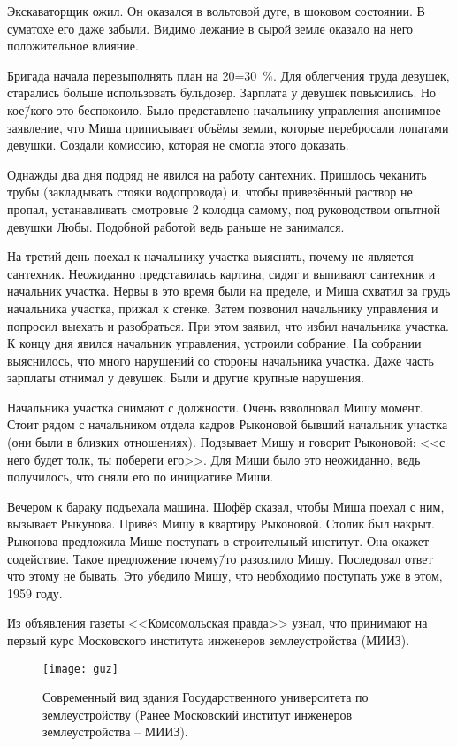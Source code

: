 Экскаваторщик ожил. Он оказался в вольтовой дуге, в шоковом состоянии. В суматохе его даже забыли. Видимо лежание в сырой земле оказало на него положительное влияние. 

Бригада начала перевыполнять план на 20\==30 \%. Для облегчения труда девушек, старались больше использовать бульдозер. Зарплата у девушек повысились. Но кое\=/кого это беспокоило. Было представлено начальнику управления анонимное заявление, что Миша приписывает объёмы земли, которые перебросали лопатами девушки. Создали комиссию, которая не смогла этого доказать.

Однажды два дня подряд не явился на работу сантехник. Пришлось чеканить трубы (закладывать стояки водопровода) и, чтобы привезённый раствор не пропал, устанавливать смотровые 2 колодца самому, под руководством опытной девушки Любы. Подобной работой ведь раньше не занимался.

На третий день поехал к начальнику участка выяснять, почему не является сантехник. Неожиданно представилась картина, сидят и выпивают сантехник и начальник участка. Нервы в это время были на пределе, и Миша схватил за грудь начальника участка, прижал к стенке. Затем позвонил начальнику управления и попросил выехать и разобраться. При этом заявил, что избил начальника участка. К концу дня явился начальник управления, устроили собрание. На собрании выяснилось, что много нарушений со стороны начальника участка. Даже часть зарплаты отнимал у девушек. Были и другие крупные нарушения.

Начальника участка снимают с должности. Очень взволновал Мишу момент. Стоит рядом с начальником отдела кадров Рыконовой бывший начальник участка (они были в близких отношениях). Подзывает Мишу и говорит Рыконовой: <<с него будет толк, ты побереги его>>. Для Миши было это неожиданно, ведь получилось, что сняли его по инициативе Миши. 

Вечером к бараку подъехала машина. Шофёр сказал, чтобы Миша поехал с ним, вызывает Рыкунова. Привёз Мишу в квартиру Рыконовой. Столик был накрыт. Рыконова предложила Мише поступать в строительный институт. Она окажет содействие. Такое предложение почему\=/то разозлило Мишу. Последовал ответ что этому не бывать. Это убедило Мишу, что необходимо поступать уже в этом, 1959 году.

Из объявления газеты <<Комсомольская правда>> узнал, что принимают на первый курс Московского института инженеров землеустройства (МИИЗ).

\begin{wrapfigure}{O}{.4\textwidth}
\centering
\texttt{[image: guz]}
\caption[{Современный вид здания Государственного университета по землеустройству (Ранее Московский институт инженеров землеустройства \--- МИИЗ).}]{Современный вид здания Государственного университета по землеустройству (Ранее Московский институт инженеров землеустройства \--- МИИЗ)\footnotemark.}
\label{fig:guz}
\end{wrapfigure}

